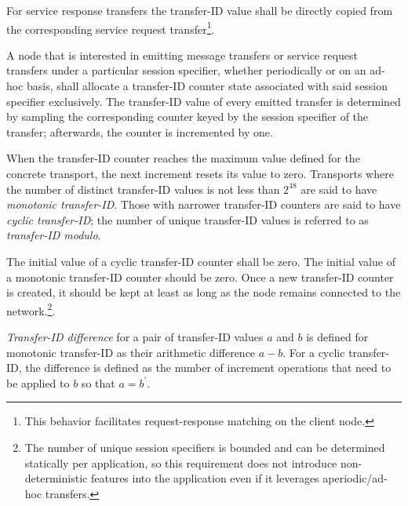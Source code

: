 For service response transfers the transfer-ID value shall be directly copied from the corresponding
service request transfer\footnote{This behavior facilitates request-response matching on the client node.}.

A node that is interested in emitting message transfers or service request transfers
under a particular session specifier, whether periodically or on an ad-hoc basis,
shall allocate a transfer-ID counter state associated with said session specifier exclusively.
The transfer-ID value of every emitted transfer is determined by sampling the corresponding counter
keyed by the session specifier of the transfer; afterwards, the counter is incremented by one.

When the transfer-ID counter reaches the maximum value defined for the concrete transport,
the next increment resets its value to zero.
Transports where the number of distinct transfer-ID values is not less than $2^{48}$ are said to have
\emph{monotonic transfer-ID}.
Those with narrower transfer-ID counters are said to have \emph{cyclic transfer-ID};
the number of unique transfer-ID values is referred to as \emph{transfer-ID modulo}.

The initial value of a cyclic transfer-ID counter shall be zero.
The initial value of a monotonic transfer-ID counter should be zero.
Once a new transfer-ID counter is created,
it should be kept at least as long as the node remains connected to the network.\footnote{%
    The number of unique session specifiers is bounded and can be determined statically per application,
    so this requirement does not introduce non-deterministic features into the application even if it leverages
    aperiodic/ad-hoc transfers.
}.

\emph{Transfer-ID difference} for a pair of transfer-ID values $a$ and $b$ is defined
for monotonic transfer-ID as their arithmetic difference $a-b$.
For a cyclic transfer-ID, the difference is defined as the number of increment operations that need to be applied
to $b$ so that $a = b^\prime{}$.

